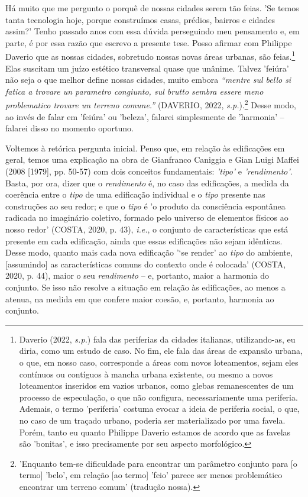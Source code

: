 \documentclass[twoside, 12pt, english,italian,latin,greek,french,spanish,brazil]{book}
\begin{document}
    Há muito que me pergunto o porquê de nossas cidades serem tão feias. 'Se temos tanta tecnologia hoje, porque construímos casas, prédios, bairros e cidades assim?' Tenho passado anos com essa dúvida perseguindo meu pensamento e, em parte, é por essa razão que escrevo a presente tese. Posso afirmar com Philippe Daverio que as nossas cidades, sobretudo nossas novas áreas urbanas, são feias.\footnote[1]{Daverio (2022, \textit{s.p.}) fala das periferias da cidades italianas, utilizando-as, eu diria, como um estudo de caso. No fim, ele fala das áreas de expansão urbana, o que, em nosso caso, corresponde a áreas com novos loteamentos, sejam eles contínuos ou contíguos à mancha urbana existente, ou mesmo a novos loteamentos inseridos em vazios urbanos, como glebas remanescentes de um processo de especulação, o que não configura, necessariamente uma periferia. Ademais, o termo 'periferia' costuma evocar a ideia de periferia social, o que, no caso de um traçado urbano, poderia ser materializado por uma favela. Porém, tanto eu quanto Philippe Daverio %
     estamos de acordo que as favelas são 'bonitas', e isso precisamente por seu aspecto morfológico.} Elas suscitam um juízo estético transversal quase que unânime. Talvez 'feiúra' não seja o que melhor define nossas cidades, muito embora \textit{“mentre sul bello si fatica a trovare un parametro congiunto, sul brutto sembra essere meno problematico trovare un terreno comune.”} (DAVERIO, 2022, \textit{s.p.}).\footnote[2]{'Enquanto tem-se dificuldade para encontrar um parâmetro conjunto para [o termo] 'belo', em relação [ao termo] 'feio' parece ser menos problemático encontrar um terreno comum' (tradução nossa).} Desse modo, ao invés de falar em 'feiúra' ou 'beleza', falarei simplesmente de 'harmonia' – falarei disso no momento oportuno.
     
     Voltemos à retórica pergunta inicial. Penso que, em relação às edificações em geral, temos uma explicação na obra de Gianfranco Caniggia e Gian Luigi Maffei (2008 [1979], pp. 50-57) com dois conceitos fundamentais: \textit{'tipo'} e \textit{'rendimento'}. Basta, por ora, dizer que o \textit{rendimento} é, no caso das edificações, a medida da coerência entre o \textit{tipo} de uma edificação individual e o \textit{tipo} presente nas construções ao seu redor; e que o \textit{tipo} é 'o produto da consciência espontânea radicada no imaginário coletivo, formado pelo universo de elementos físicos ao nosso redor' (COSTA, 2020, p. 43), \textit{i.e.}, o conjunto de características que está presente em cada edificação, ainda que essas edificações não sejam idênticas. Desse modo, quanto mais cada nova edificação '‘se render’ ao \textit{tipo} do ambiente, [assumindo] as características comuns do contexto onde é colocada' (COSTA, 2020, p. 44), maior o seu \textit{rendimento} – e, portanto, maior a harmonia do conjunto. Se isso não resolve a situação em relação às edificações, ao menos a atenua, na medida em que confere maior coesão, e, portanto, harmonia ao conjunto.
\end{document}
